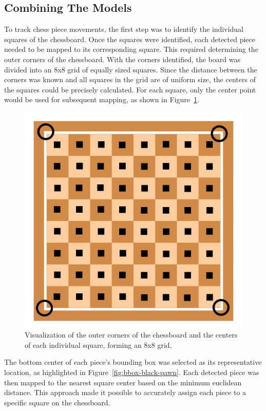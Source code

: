 

\subsection{Combining The Models}

To track chess piece movements, the first step was to identify the individual squares of the chessboard. Once the squares were identified, each detected piece needed to be mapped to its corresponding square. This required determining the outer corners of the chessboard. With the corners identified, the board was divided into an 8x8 grid of equally sized squares. Since the distance between the corners was known and all squares in the grid are of uniform size, the centers of the squares could be precisely calculated. For each square, only the center point would be used for subsequent mapping, as shown in Figure~\ref{fig:chessboard-centers}.



\begin{figure}[h!]
    \centering
    \includegraphics[width=0.75\linewidth]{figures/methods/ml-models/outer_corners_centers_chessboard.jpg}
    \caption[S]{Visualization of the outer corners of the chessboard and the centers of each individual square, forming an 8x8 grid. \cite{vectorstock:chessboard-svg}}
    \label{fig:chessboard-centers}
\end{figure}


The bottom center of each piece’s bounding box was selected as its representative location, as highlighted in Figure~\ref{fig:bbox-black-pawn}. Each detected piece was then mapped to the nearest square center based on the minimum euclidean distance.  This approach made it possible to accurately assign each piece to a specific square on the chessboard.


